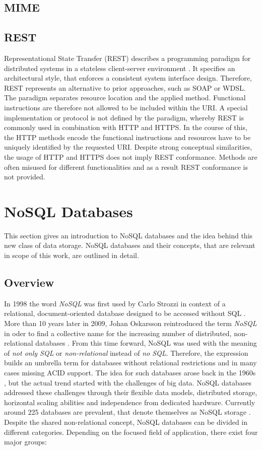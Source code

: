 \subsection{MIME}

\subsection{REST}
Representational State Transfer (REST) describes a programming paradigm for distributed systems in a stateless client-server environment \cite{Fielding:2000}. It specifies an architectural style, that enforces a consistent system interface design. Therefore, REST represents an alternative to prior approaches, such as SOAP or WDSL. The paradigm separates resource location and the applied method. Functional instructions are therefore not allowed to be included within the URI. A special implementation or protocol is not defined by the paradigm, whereby REST is commonly used in combination with HTTP and HTTPS. In the course of this, the HTTP methods encode the functional instructions and resources have to be uniquely identified by the requested URI. Despite strong conceptual similarities, the usage of HTTP and HTTPS does not imply REST conformance. Methods are often misused for different functionalities and as a result REST conformance is not provided.

\section{NoSQL Databases}
This section gives an introduction to NoSQL databases and the idea behind this new class of data storage. NoSQL databases and their concepts, that are relevant in scope of this work, are outlined in detail.

\subsection{Overview}
In 1998 the word \textit{NoSQL} was first used by Carlo Strozzi in context of a relational, document-oriented database designed to be accessed without SQL \cite{Strozzi:2007}. More than 10 years later in 2009, Johan Oskarsson reintroduced the term \textit{NoSQL} in oder to find a collective name for the increasing number of distributed, non-relational databases \cite{Oskarsson:2009}. From this time forward, NoSQL was used with the meaning of \textit{not only SQL} or \textit{non-relational} instead of \textit{no SQL}. Therefore, the expression builds an umbrella term for databases without relational restrictions and in many cases missing ACID support. The idea for such databases arose back in the 1960s \cite{IBM:2016, Nelson:1965}, but the actual trend started with the challenges of big data. NoSQL databases addressed these challenges through their flexible data models, distributed storage, horizontal scaling abilities and independence from dedicated hardware. Currently around 225 databases are prevalent, that denote themselves as NoSQL storage \cite{Edlich:2016}. Despite the shared non-relational concept, NoSQL databases can be divided in different categories. Depending on the focused field of application, there exist four major groups:

